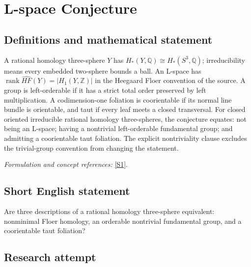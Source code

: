 \documentclass[11pt,a4paper]{article}
\newcommand{\Z}{\mathbb{Z}}
\newcommand{\Q}{\mathbb{Q}}
\newcommand{\sref}[2]{\hyperlink{source:#1:#2}{[S#2]}}
\newif\ifshowcatalogue
\newcommand{\cataloguescope}[1]{\ifshowcatalogue
 \paragraph{Exact scope in the supplied catalogue.}
 \begin{quote}\small #1\end{quote}\fi}
\numberwithin{equation}{section}
\begin{document}
\setcounter{section}{180}
\clearpage
\section{\texorpdfstring{L-space Conjecture}{L-space Conjecture}}\label{181}
\subsection{Definitions and mathematical statement}
A rational homology three-sphere $Y$ has $H_*(Y,\Q)\cong H_*(S^3,\Q)$; irreducibility means every embedded two-sphere bounds a ball. An L-space has
$\operatorname{rank}\widehat{HF}(Y)=|H_1(Y,\Z)|$ in the Heegaard Floer convention of the source. A group is left-orderable if it has a strict total order preserved by left multiplication. A codimension-one foliation is coorientable if its normal line bundle is orientable, and taut if every leaf meets a closed transversal. For closed oriented irreducible rational homology three-spheres, the conjecture equates: not being an L-space; having a nontrivial left-orderable fundamental group; and admitting a coorientable taut foliation. The explicit nontriviality clause excludes the trivial-group convention from changing the statement.
\par\smallskip\textit{Formulation and concept references:} \sref{181}{1}.
\cataloguescope{Prove or disprove: for a closed, oriented, irreducible rational homology 3-sphere Y, the following are equivalent: (1) Y is not a Heegaard Floer L-space; (2) pi\_1(Y) is nontrivial and admits a left-invariant strict total order; (3) Y admits a coorientable taut foliation.}
\subsection{Short English statement}
Are three descriptions of a rational homology three-sphere equivalent: nonminimal Floer homology, an orderable nontrivial fundamental group, and a coorientable taut foliation?
\subsection{Research attempt}
\end{document}
